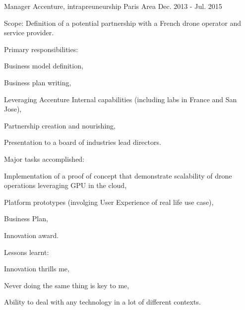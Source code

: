 

\begin{cventries}

  \cventry
    {Manager} %
    {Accenture, intrapreuneurship} %
    {Paris Area} %
    {Dec. 2013 - Jul. 2015} %
    {
      \begin{cvitems} %
        \item {Scope: Definition of a potential partnership with a French drone operator and service provider.}
        \item {Primary responsibilities:}
        \begin{cvsubitems}
          \item {Business model definition,}
          \item {Business plan writing,}
          \item {Leveraging Accenture Internal capabilities (including labs in France and San Jose),}
          \item {Partnership creation and nourishing,}
          \item {Presentation to a board of industries lead directors.}
        \end{cvsubitems}
        \item {Major tasks accomplished:}
        \begin{cvsubitems}
          \item {Implementation of a proof of concept that demonstrate scalability of drone operations leveraging GPU in the cloud,}
          \item {Platform prototypes (involging User Experience of real life use case),}
          \item {Business Plan,}
          \item {Innovation award.}
        \end{cvsubitems}
        \item {Lessons learnt:}
        \begin{cvsubitems}
          \item {Innovation thrills me,}
          \item {Never doing the same thing is key to me,}
          \item {Ability to deal with any technology in a lot of different contexts.}
        \end{cvsubitems}
      \end{cvitems}
    }


\end{cventries}
